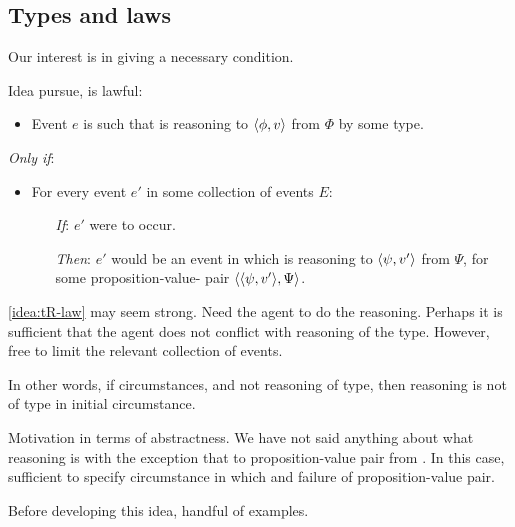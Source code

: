 \subsection{Types and laws}

\begin{note}
  Our interest is in giving a necessary condition.

  Idea pursue, \tRN{} is lawful:

  \begin{idea}
    \label{idea:tR-law}

    \begin{itemize}
    \item
      Event \(e\) is such that \vAgent{} is reasoning to \(\langle \phi, v \rangle\) from \(\Phi\) by some type.
    \end{itemize}

    \emph{Only if}:

    \begin{itemize}
    \item
      For every event \(e'\) in some collection of events \(E\):
      \begin{itemize}
      \item[\emph{If}:]
        \(e'\) were to occur.
      \item[\emph{Then}:]
        \(e'\) would be an event in which \vAgent{} is reasoning to \(\langle \psi, v' \rangle\) from \(\Psi\), for some proposition-value-\pool{} pair \(\langle \langle \psi, v' \rangle, \Psi \rangle\).
      \end{itemize}
    \end{itemize}
    \vspace{-\baselineskip}
  \end{idea}

  \autoref{idea:tR-law} may seem strong.
  Need the agent to do the reasoning.
  Perhaps it is sufficient that the agent does not conflict with reasoning of the type.
  However, free to limit the relevant collection of events.

  In other words, if circumstances, and not reasoning of type, then reasoning is not of type in initial circumstance.

  Motivation in terms of abstractness.
  We have not said anything about what reasoning is with the exception that to proposition-value pair from \pool{}.
  In this case, sufficient to specify circumstance in which \pool{} and failure of proposition-value pair.

  Before developing this idea, handful of examples.
\end{note}

